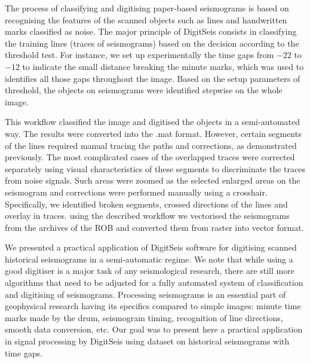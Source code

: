 \documentclass[sensors,article,accept,moreauthors,pdftex]{Definitions/mdpi}
\begin{document}
The process of classifying and digitising paper-based seismograms is based on {recognising the }features of the scanned objects {such as }lines and{ handwritten }marks{ }classified as noise{. }The major principle of DigitSeis {consists in }classifying {the }training lines (traces of seismograms) based on {the decision according to the }threshold test. For instance, we set up experimentally the time gaps from $-22$ to $-12$ to indicate the small distance breaking the minute marks, which was used{ }to identifies all those gaps {throughout }the image. Based on the setup parameters of threshold, the{ }objects on seismograms {were identified stepwise on }the whole image.

This workflow {classified }the image and {digitised }the objects {in a semi-automated way. The results were converted into }the .mat format{. }However, certain segments of the lines required manual tracing the paths and corrections, as demonstrated previously. The most complicated cases {of the }overlapped traces{ }were {corrected} separately {using }visual characteristics of these segments{ }to discriminate the traces from noise signals. {Such areas were }zoomed {as the }selected enlarged areas on the seismogram and{ }corrections {were performed }manually using a crosshair. Specifically, we identified broken segments, crossed directions of the lines and overlay in traces. {using the described workflow we vectorised the seismograms from the archives of the ROB and converted them from raster into vector format.}

We presented {a} practical application of DigitSeis software for digitising scanned historical seismograms in a semi-automatic regime. We note that while using a good digitiser is a major task of any seismological research, there are still more algorithms that need to be adjusted for a fully automated system of classification and digitising of seismograms. Processing seismograms is an essential part of geophysical research having its specifics compared to simple images: minute time marks made by the drum, seismogram timing, recognition of line directions, smooth data conversion, etc. Our goal was to present here a practical application in signal processing by DigitSeis using dataset on historical seismograms with time gaps.
\end{document}
